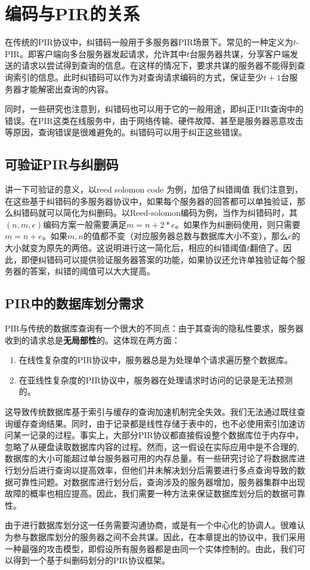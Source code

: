\section{编码与PIR的关系}
在传统的PIR协议中，纠错码一般用于多服务器PIR场景下。常见的一种定义为$t$-PIR。即客户端向多台服务器发起请求，允许其中$t$台服务器共谋，分享客户端发送的请求以尝试得到查询的信息。在这样的情况下，要求共谋的服务器不能得到查询索引的信息。此时纠错码可以作为对查询请求编码的方式，保证至少$t+1$台服务器才能解密出查询的内容。

同时，一些研究\cite{10.1007/978-3-031-22368-6_3}也注意到，纠错码也可以用于它的一般用途，即纠正PIR查询中的错误。在PIR这类在线服务中，由于网络传输、硬件故障、甚至是服务器恶意攻击等原因，查询错误是很难避免的。纠错码可以用于纠正这些错误。

\subsection{可验证PIR与纠删码}

{讲一下可验证的意义，以reed solomon code 为例，加倍了纠错阈值}
我们注意到，在这些基于纠错码的多服务器协议中，如果每个服务器的回答都可以单独验证，那么纠错码就可以简化为纠删码。以Reed-solomon编码为例，当作为纠错码时，其$(n,m,e)$编码方案一般需要满足$m=n+2*e$。如果作为纠删码使用，则只需要$m=n+e$。如果$m,n$的值都不变（对应服务器总数与数据库大小不变），那么$e$的大小就变为原先的两倍。这说明进行这一简化后，相应的纠错阈值$t$翻倍了。因此，即便纠错码可以提供验证服务器答案的功能，如果协议还允许单独验证每个服务器的答案，纠错的阈值可以大大提高。

\subsection{PIR中的数据库划分需求}
PIR与传统的数据库查询有一个很大的不同点：由于其查询的隐私性要求，服务器收到的请求总是\textbf{无局部性}的。这体现在两方面：
\begin{enumerate}
    \item 在线性复杂度的PIR协议中，服务器总是为处理单个请求遍历整个数据库。
    \item 在亚线性复杂度的PIR协议中，服务器在处理请求时访问的记录是无法预测的。
\end{enumerate}

这导致传统数据库基于索引与缓存的查询加速机制完全失效。我们无法通过既往查询缓存查询结果。同时，由于记录都是线性存储于表中的，也不必使用索引加速访问某一记录的过程。事实上，大部分PIR协议都直接假设整个数据库位于内存中，忽略了从硬盘读取数据库内容的过程。然而，这一假设在实际应用中是不合理的,数据库的大小可能超过单台服务器可用的内存总量。有一些研究讨论了将数据库进行划分后进行查询\cite{RAID-PIR}以提高效率，但他们并未解决划分后需要进行多点查询导致的数据可靠性问题。对数据库进行划分后，查询涉及的服务器增加，服务器集群中出现故障的概率也相应提高。因此，我们需要一种方法来保证数据库划分后的数据可靠性。

由于进行数据库划分这一任务需要沟通协商，或是有一个中心化的协调人。很难认为参与数据库划分的服务器之间不会共谋。因此，在本章提出的协议中，我们采用一种最强的攻击模型，即假设所有服务器都是由同一个实体控制的。由此，我们可以得到一个基于纠删码划分的PIR协议框架。
